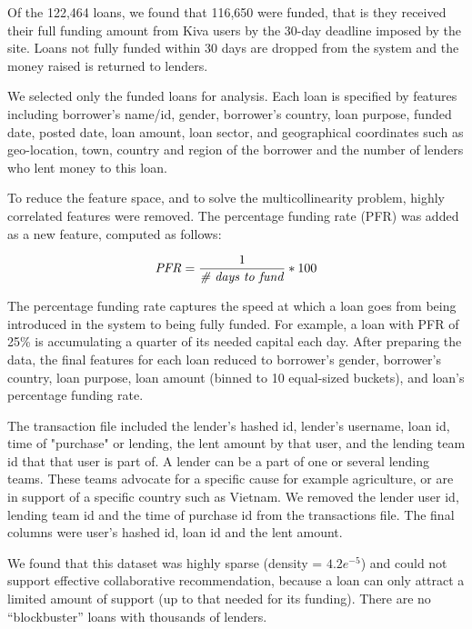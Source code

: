     Of the 122,464 loans, we found that 116,650 were funded, that is they received their full funding amount from Kiva users by the 30-day deadline imposed by the site. Loans not fully funded within 30 days are dropped from the system and the money raised is returned to lenders.
    
    We selected only the funded loans for analysis. Each loan is specified by features including borrower's name/id, gender, borrower's country, loan purpose, funded date, posted date, loan amount, loan sector, and geographical coordinates such as geo-location, town, country and region of the borrower and the number of lenders who lent money to this loan.
    
    To reduce the feature space, and to solve the multicollinearity problem, highly correlated features were removed. The percentage funding rate (PFR) was added as a new feature, computed as follows:
    
    \begin{equation}
     \mbox{\textit{PFR}} =  \frac{1}{\mbox{\textit{{\#} days to fund}}} * 100 
    \end{equation}
    
    The percentage funding rate captures the speed at which a loan goes from being introduced in the system to being fully funded. For example, a loan with PFR of 25\% is accumulating a quarter of its needed capital each day. After preparing the data, the final features for each loan reduced to borrower's gender, borrower's country, loan purpose, loan amount (binned to 10 equal-sized buckets), and loan's percentage funding rate. 
    
    The transaction file included the lender's hashed id, lender's username, loan id, time of "purchase" or lending, the lent amount by that user, and the lending team id that that user is part of. A lender can be a part of one or several lending teams. These teams advocate for a specific cause for example agriculture, or are in support of a specific country such as Vietnam. We removed the lender user id, lending team id and the time of purchase id from the transactions file. The final columns were user's hashed id, loan id and the lent amount.
    
    
    We found that this dataset was highly sparse (density = $4.2e^{-5}$) and could not support effective collaborative recommendation, because a loan can only attract a limited amount of support (up to that needed for its funding). There are no ``blockbuster'' loans with thousands of lenders.
    
